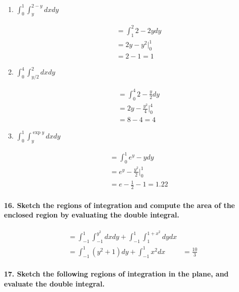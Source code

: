 \documentclass{article}
\begin{document}
\begin{enumerate}
\item $ \int_0^1 \int_y^{2-y} dx dy $

\begin{align*}
    &= \int_{1}^{2}2-2y dy \\
    &= 2y-y^2\Bigr|_{0}^{1} \\
    &= 2-1 = 1
\end{align*}

\item $ \int_0^4 \int_{y/2}^2 dx dy $

\begin{align*}
    &= \int_{0}^{4}2-\frac{y}{2} dy \\
    &= 2y-\frac{y^2}{4}\Bigr|_{0}^{4} \\
    &= 8-4 = 4
\end{align*}

\item $ \int_0^1 \int_y^{\exp y} dx dy $

\begin{align*}
    &= \int_{0}^{1}e^y-y dy \\
    &= e^y-\frac{y^2}{2}\Bigr|_{0}^{1} \\
    &= e-\frac{1}{2}-1 = 1.22
\end{align*}

\end{enumerate}

\paragraph{16. Sketch the regions of integration and compute the area of the enclosed region by evaluating the double integral.}

\begin{align*}
    &= \int_{-1}^1 \int_{-1}^{y^2} dxdy + \int_{-1}^1 \int_{1}^{1+x^2} dydx \\
    &= \int_{-1}^1 (y^2 + 1) dy + \int_{-1}^1 x^2 dx
    &= \frac{10}{3}
\end{align*}

\paragraph{17. Sketch the following regions of integration in the plane, and evaluate the double integral.}
\end{document}

